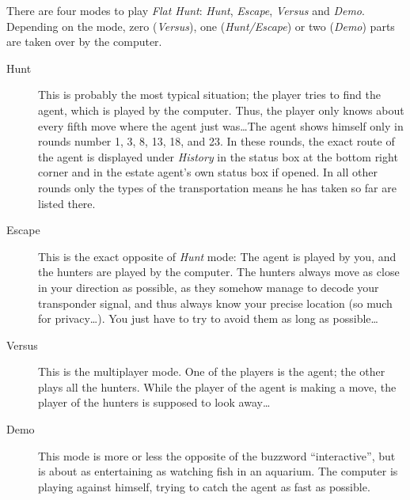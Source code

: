 There are four modes to play \emph{Flat Hunt}: \emph{Hunt}, \emph{Escape}, \emph{Versus} and \emph{Demo}. Depending on the mode, zero (\emph{Versus}), one (\emph{Hunt/Escape}) or two (\emph{Demo}) parts are taken over by the computer.

  \begin{description}
    
    \item[Hunt]This is probably the most typical situation; the player tries to find the agent, which is played by the computer. Thus, the player only knows about every fifth move where the agent just was\ldots The agent shows himself only in rounds number 1, 3, 8, 13, 18, and 23. In these rounds, the exact route of the agent is displayed under \emph{History} in the status box at the bottom right corner and in the estate agent's own status box if opened. In all other rounds only the types of the transportation means he has taken so far are listed there.
    
    \item[Escape]This is the exact opposite of \emph{Hunt} mode: The agent is played by you, and the hunters are played by the computer. The hunters always move as close in your direction as possible, as they somehow manage to decode your transponder signal, and thus always know your precise location (so much for privacy\ldots). You just have to try to avoid them as long as possible\ldots
  
    \item[Versus]This is the multiplayer mode. One of the players is the agent; the other plays all the hunters. While the player of the agent is making a move, the player of the hunters is supposed to look away\ldots
   
    \item[Demo]This mode is more or less the opposite of the buzzword ``interactive'', but is about as entertaining as watching fish in an aquarium. The computer is playing against himself, trying to catch the agent as fast as possible.
  
  \end{description}
